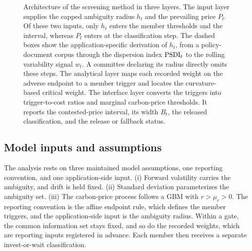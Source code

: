 \begin{figure}[!t]
{}
\caption{Architecture of the screening method in three layers. The input layer supplies the capped ambiguity radius $h_t$ and the prevailing price $P_t$. Of these two inputs, only $h_t$ enters the member thresholds and the interval, whereas $P_t$ enters at the classification step. The dashed boxes show the application-specific derivation of $h_t$, from a policy-document corpus through the dispersion index $\mathrm{PSDI}_t$ to the rolling variability signal $w_t$. A committee declaring its radius directly omits these steps. The analytical layer maps each recorded weight on the adverse endpoint to a member trigger and locates the curvature-based critical weight. The interface layer converts the triggers into trigger-to-cost ratios and marginal carbon-price thresholds. It reports the contested-price interval, its width $B_t$, the released classification, and the release or fallback status.}
\label{fig:architecture}
\end{figure}

\subsection{Model inputs and assumptions}

The analysis rests on three maintained model assumptions, one reporting convention, and one application-side input. (i) Forward volatility carries the ambiguity, and drift is held fixed. (ii) Standard deviation parameterizes the ambiguity set. (iii) The carbon-price process follows a GBM with $r>\mu_c>0$. The reporting convention is the affine endpoint rule, which defines the member triggers, and the application-side input is the ambiguity radius. Within a gate, the common information set stays fixed, and so do the recorded weights, which are reporting inputs registered in advance. Each member then receives a separate invest-or-wait classification.

